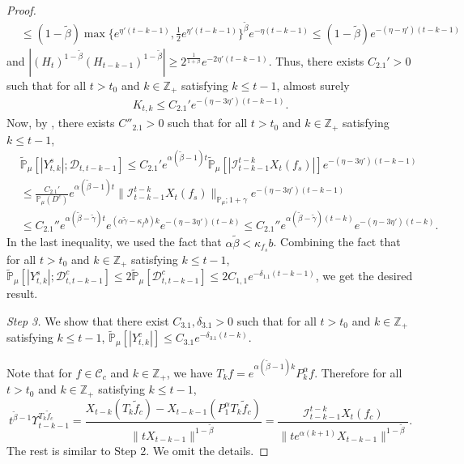 \documentclass[12pt,a4paper]{amsart}
\theoremstyle{plain}
\theoremstyle{definition}
\numberwithin{equation}{section}
\begin{document}
\begin{proof}
\begin{align}
    & \leq (1- \tilde \beta ) \max\{e^{\eta' (t-k-1)}, \frac{1}{2}e^{\eta'(t-k-1)}\}^{\tilde \beta} e^{-\eta(t-k-1)}  \leq (1- \tilde \beta) e^{-(\eta - \eta') (t-k-1)}
  \end{align}
  and $ |(H_t)^{1 - \tilde \beta} (H_{t-k-1})^{ 1 - \tilde \beta}| \geq 2^{\frac{1}{1+\beta}} e^{-2\eta'(t-k-1)}$.
  Thus, there exists $C_{2.1}'> 0$ such that for all $t>t_0$ and $k\in \mathbb Z_+$ satisfying $k\leq t-1$, almost surely
  \begin{align}
    K_{t,k}
    \leq C_{2.1}' e^{-(\eta - 3\eta')(t-k-1)}.
  \end{align}
  Now, by \cite[Lemma 2.13]{RenSongSunZhao2019Stable}, there exists $C''_{2.1}>0$ such that for all $t>t_0$ and $k\in \mathbb Z_+$ satisfying $k\leq t-1$,
  \begin{align}
    & \mathbb{\widetilde{P}}_{\mu} [|Y^s_{t,k}| ; \mathcal{D}_{t,t-k-1} ]
    \leq C_{2.1}' e^{\alpha (\tilde \beta - 1)t} \mathbb{\widetilde{P}}_{\mu} [ | \mathcal{I}_{t-k-1}^{t-k}X_t(f_s)| ] e^{-(\eta - 3\eta')(t-k-1)} \\
    & \leq \frac{C_{2.1}' } {\mathbb{P}_{\mu}(D^c)} e^{ \alpha (\tilde \beta - 1)t} \|\mathcal{I}_{t-k-1}^{t-k} X_t(f_s)\|_{\mathbb P_\mu; 1+\gamma} e^{-(\eta - 3\eta')(t-k - 1)} \\
    & \leq C_{2.1}'' e^{\alpha(\tilde \beta - \tilde \gamma)t} e^{ (\alpha \tilde \gamma - \kappa_f b)k} e^{-(\eta - 3\eta')(t-k)}
     \leq C_{2.1}'' e^{\alpha(\tilde \beta - \tilde \gamma)(t-k)} e^{-(\eta - 3\eta')(t-k)}.
  \end{align}
  In the last inequality, we used the fact that $\alpha \tilde \beta < \kappa_{f_s} b$. Combining the fact that for all $t>t_0$ and $k\in \mathbb Z_+$ satisfying $k\leq t-1$, $\mathbb{\widetilde{P}}_{\mu} [|Y^s_{t,k}| ; \mathcal{D}^c_{t,t-k-1} ]\leq 2\mathbb{\widetilde{P}}_{\mu} [ \mathcal{D}^c_{t,t-k-1} ]\leq 2 C_{1,1}e^{-\delta_{1.1}(t-k-1)}$, we get the desired result.

 \emph{Step 3.} We show that there exist $C_{3.1},\delta_{3.1} > 0$ such that for all $t>t_0$ and $k\in \mathbb Z_+$ satisfying $k\leq t-1$, $ \mathbb{\widetilde{P}}_{\mu}[|Y^c_{t,k}|] \leq  C_{3.1} e^{-\delta_{3.1} (t-k)}.$

  Note that for $f\in \mathcal C_c$ and $k\in \mathbb Z_+$, we have $T_kf = e^{\alpha (\tilde \beta - 1 )k}P_k^\alpha f$. Therefore for all $t>t_0$ and $k\in \mathbb Z_+$ satisfying $k\leq t-1$,
  \[
    t^{\tilde \beta - 1} \Upsilon_{t-k-1}^{T_{k} \tilde f_c}
    = \frac{X_{t-k}(T_{k} \tilde f_c) - X_{t -k-1}(P_1^\alpha T_{k} \tilde f_c)}{\|t X_{t-k-1}\|^{1-\tilde \beta}}
    = \frac{\mathcal I_{t - k - 1}^{t - k} X_t(f_c)}{\|te^{\alpha (k+1)}X_{t-k-1} \|^{1 -\tilde \beta}}.
  \]
  The rest is similar to Step 2.
  We omit the details.


\end{proof}
\end{document}
